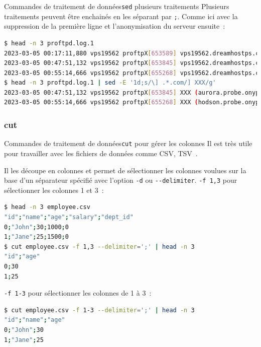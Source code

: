 \documentclass{beamer}
\begin{document}
    \begin{frame}[fragile]{Commandes de traitement de données}{\lstinline{sed} plusieurs traitements}
        Plusieurs traitements peuvent être enchainés en les séparant par \lstinline{;}.
        Comme ici avec la suppression de la première ligne et l'anonymisation du serveur ensuite~:
        \begin{lstlisting}[language=bash,basicstyle=\tiny\ttfamily]
$ head -n 3 proftpd.log.1
2023-03-05 00:17:11,880 vps19562 proftpX[653589] vps19562.dreamhostps.com: ProFTPD 1.3.6c (maint) (built Thu Feb 27 2020 19:34:56 UTC) standalone mode STARTUP
2023-03-05 00:47:51,132 vps19562 proftpX[653845] vps19562.dreamhostps.com (aurora.probe.onyphe.net[142.4.218.114]): USER anonymous: no such user found from aurora.probe.onyphe.net [142.4.218.114] to~::ffff:66.33.201.239:21
2023-03-05 00:55:14,666 vps19562 proftpX[655268] vps19562.dreamhostps.com (hodson.probe.onyphe.net[178.32.197.87]): USER anonymous: no such user found from hodson.probe.onyphe.net [178.32.197.87] to~::ffff:66.33.201.239:21
$ head -n 3 proftpd.log.1 | sed -E '1d;s/\] .*.com/] XXX/g'
2023-03-05 00:47:51,132 vps19562 proftpX[653845] XXX (aurora.probe.onyphe.net[142.4.218.114]): USER anonymous: no such user found from aurora.probe.onyphe.net [142.4.218.114] to~::ffff:66.33.201.239:21
2023-03-05 00:55:14,666 vps19562 proftpX[655268] XXX (hodson.probe.onyphe.net[178.32.197.87]): USER anonymous: no such user found from hodson.probe.onyphe.net [178.32.197.87] to~::ffff:66.33.201.239:21
        \end{lstlisting}
    \end{frame}

    \subsubsection{cut}\label{subsubsec:cut}
    \begin{frame}[fragile]{Commandes de traitement de données}{\lstinline{cut} pour gérer les colonnes}
        Il est très utile pour travailler avec les fichiers de données comme CSV, TSV~.

        Il les découpe en colonnes et permet de sélectionner les colonnes voulues sur la base d'un séparateur spécifié avec l'option \lstinline{-d} ou \lstinline{--delimiter}.
        \bigbreak
        \lstinline{-f 1,3} pour sélectionner les colonnes 1 et 3~:
        \begin{lstlisting}[language=bash,basicstyle=\tiny\ttfamily]
$ head -n 3 employee.csv
"id";"name";"age";"salary";"dept_id"
0;"John";30;1000;0
1;"Jane";25;1500;0
$ cut employee.csv -f 1,3 --delimiter=';' | head -n 3
"id";"age"
0;30
1;25
        \end{lstlisting}
        \lstinline{-f 1-3} pour sélectionner les colonnes de 1 à 3~:
        \begin{lstlisting}[language=bash,basicstyle=\tiny\ttfamily]
$ cut employee.csv -f 1-3 --delimiter=';' | head -n 3
"id";"name";"age"
0;"John";30
1;"Jane";25
        \end{lstlisting}
    \end{frame}
\end{document}
